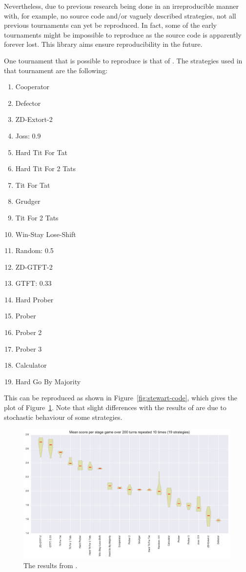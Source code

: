 \documentclass{jors}
\begin{document}
Nevertheless, due to previous research being done in an irreproducible manner
with, for example, no source code and/or vaguely described strategies, not all
previous tournaments can yet be reproduced. In fact, some of the early
tournaments might be impossible to reproduce as the source code is apparently
forever lost. This library aims ensure reproducibility in the future.

One tournament that is possible to reproduce is that of
\cite{Stewart2012}. The strategies used in that tournament are the following:

\begin{multicols}{2}
    \begin{enumerate}[noitemsep,topsep=0pt]
        \item Cooperator
        \item Defector
        \item ZD-Extort-2
        \item Joss: 0.9
        \item Hard Tit For Tat
        \item Hard Tit For 2 Tats
        \item Tit For Tat
        \item Grudger
        \item Tit For 2 Tats
        \item Win-Stay Lose-Shift
        \item Random: 0.5
        \item ZD-GTFT-2
        \item GTFT: 0.33
        \item Hard Prober
        \item Prober
        \item Prober 2
        \item Prober 3
        \item Calculator
        \item Hard Go By Majority
    \end{enumerate}
\end{multicols}

This can be reproduced as shown in Figure~\ref{fig:stewart-code}, which gives
the plot of Figure~\ref{fig:stewart_tournament}. Note that slight differences
with the results of \cite{Stewart2012} are due to stochastic behaviour of some
strategies.

\begin{figure}[!hbtp]
	\centering
	\includegraphics[width=.75\textwidth]{stewart_tournament.pdf}
	\caption{The results from \cite{Stewart2012}.}
	\label{fig:stewart_tournament}
\end{figure}
\end{document}
